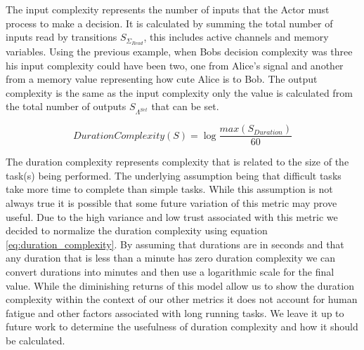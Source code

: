 The input complexity represents the number of inputs that the Actor must process to make a decision.  It is calculated by summing the total number of inputs read by transitions $S_{\Sigma_{Read}}$, this includes active channels and memory variables.  Using the previous example, when Bobs decision complexity was three his input complexity could have been two, one from Alice's signal and another from a memory value representing how cute Alice is to Bob.  The output complexity is the same as the input complexity only the value is calculated from the total number of outputs $S_{\Lambda^{Set}}$ that can be set.

\begin{equation}
  DurationComplexity(S) = \log \frac{max(S_{Duration})}{60}
  \label{eq:duration_complexity}
\end{equation}

The duration complexity represents complexity that is related to the size of the task(s) being performed.  The underlying assumption being that difficult tasks take more time to complete than simple tasks.  While this assumption is not always true it is possible that some future variation of this metric may prove useful.  Due to the high variance and low trust associated with this metric we decided to normalize the duration complexity using equation \ref{eq:duration_complexity}.  By assuming that durations are in seconds and that any duration that is less than a minute has zero duration complexity we can convert durations into minutes and then use a logarithmic scale for the final value.  While the diminishing returns of this model allow us to show the duration complexity within the context of our other metrics it does not account for human fatigue and other factors associated with long running tasks.  We leave it up to future work to determine the usefulness of duration complexity and how it should be calculated.



